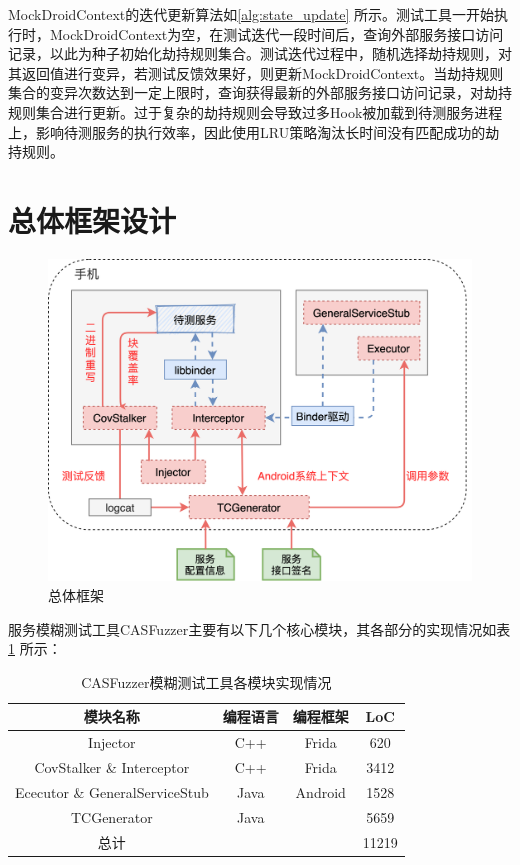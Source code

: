 \documentclass[winfonts,master,twoside]{njuthesis}
\begin{document}
MockDroidContext的迭代更新算法如\ref{alg:state_update} 所示。测试工具一开始执行时，MockDroidContext为空，在测试迭代一段时间后，查询外部服务接口访问记录，以此为种子初始化劫持规则集合。测试迭代过程中，随机选择劫持规则，对其返回值进行变异，若测试反馈效果好，则更新MockDroidContext。当劫持规则集合的变异次数达到一定上限时，查询获得最新的外部服务接口访问记录，对劫持规则集合进行更新。过于复杂的劫持规则会导致过多Hook被加载到待测服务进程上，影响待测服务的执行效率，因此使用LRU策略淘汰长时间没有匹配成功的劫持规则。

\section{总体框架设计}

\begin{figure}
	\centering
	\includegraphics[width=.9\textwidth]{figure/4-fuzzer/arch.png}
	\caption{总体框架}
	\label{fuzzer-client}
\end{figure}

服务模糊测试工具CASFuzzer主要有以下几个核心模块，其各部分的实现情况如表\ref{tbl:loc} 所示：

\begin{table}[!htbp]
	\centering
	\begin{tabular}{cccc}
		\toprule
		模块名称 & 编程语言 & 编程框架 & LoC \\
		\midrule
		Injector & C++ & Frida & 620 \\
		CovStalker \& Interceptor & C++ & Frida & 3412 \\
		Ececutor \& GeneralServiceStub & Java & Android & 1528 \\
		TCGenerator & Java & \ & 5659\\
		\hline
		总计 & & &11219 \\
		\bottomrule
	\end{tabular}
	\caption{CASFuzzer模糊测试工具各模块实现情况}
	\label{tbl:loc}
\end{table}
\end{document}
